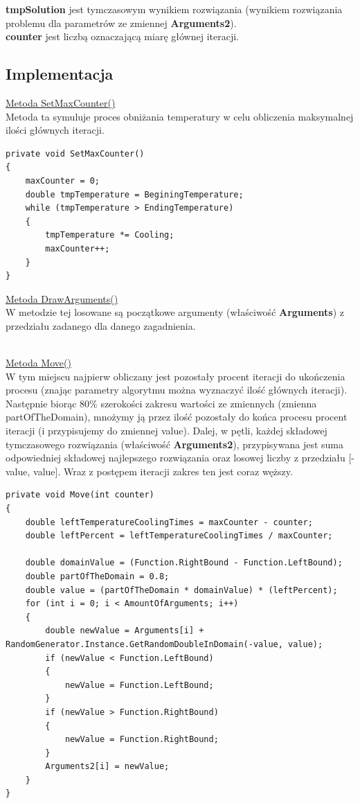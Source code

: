 \documentclass[twoside]{projektInzynierskiMS1}
\newcommand{\si}{ś}
\begin{document}
\textbf{tmpSolution} jest tymczasowym wynikiem rozwiązania (wynikiem rozwiązania problemu dla parametrów ze zmiennej \textbf{Arguments2}). \\

\textbf{counter} jest liczbą oznaczającą miarę głównej iteracji. \\

\subsection{Implementacja}

\underline{Metoda SetMaxCounter()} \\
Metoda ta symuluje proces obniżania temperatury w celu obliczenia maksymalnej ilo\si ci głównych iteracji. \\
\begin{verbatim}
private void SetMaxCounter()
{
    maxCounter = 0;
    double tmpTemperature = BeginingTemperature;
    while (tmpTemperature > EndingTemperature)
    {
        tmpTemperature *= Cooling;
        maxCounter++;
    }
}
\end{verbatim}

\underline{Metoda DrawArguments()} \\
W metodzie tej losowane są początkowe argumenty (wła\si ciwo\si ć \textbf{Arguments}) z przedziału zadanego dla danego zagadnienia. \\\

\underline{Metoda Move()} \\
W tym miejscu najpierw obliczany jest pozostały procent iteracji do ukończenia procesu (znając parametry algorytmu można wyznaczyć ilo\si ć głównych iteracji). Następnie biorąc 80\% szeroko\si ci zakresu warto\si ci ze zmiennych (zmienna partOfTheDomain), mnożymy ją przez ilo\si ć pozostały do końca procesu procent iteracji (i przypisujemy do zmiennej value). Dalej, w pętli, każdej składowej tymczasowego rozwiązania (wła\si ciwo\si ć \textbf{Arguments2}), przypisywana jest suma odpowiedniej składowej najlepszego rozwiązania oraz losowej liczby z przedziału [-value, value]. Wraz z postępem iteracji zakres ten jest coraz węższy. \\
\begin{verbatim}
private void Move(int counter)
{
    double leftTemperatureCoolingTimes = maxCounter - counter;
    double leftPercent = leftTemperatureCoolingTimes / maxCounter;

    double domainValue = (Function.RightBound - Function.LeftBound);
    double partOfTheDomain = 0.8;
    double value = (partOfTheDomain * domainValue) * (leftPercent);
    for (int i = 0; i < AmountOfArguments; i++)
    {
        double newValue = Arguments[i] + 
RandomGenerator.Instance.GetRandomDoubleInDomain(-value, value);
        if (newValue < Function.LeftBound)
        {
            newValue = Function.LeftBound;
        }
        if (newValue > Function.RightBound)
        {
            newValue = Function.RightBound;
        }
        Arguments2[i] = newValue;
    }
}
\end{verbatim}
\end{document}
